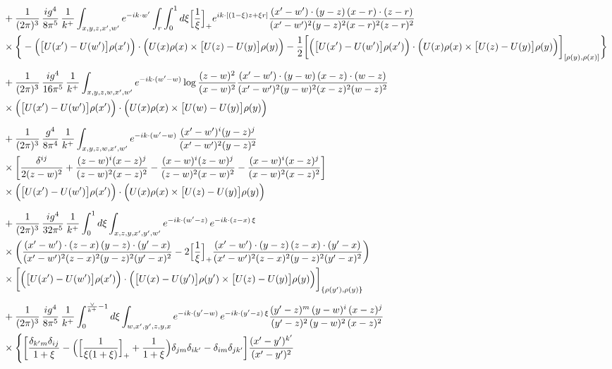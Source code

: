 \documentclass[10pt]{article}
\begin{document}
\begin{align}
&+\frac{1}{(2\pi)^{3}}\,\frac{ig^{4}}{8\pi^{5}}\,\frac{1}{k^{+}}\int_{x,y,z,x',w'}e^{-ik\cdot w'}\int_{r}\int_{0}^{1}d\xi\Big[\frac1\xi\Big]_{+}e^{ik\cdot[(1-\xi)z+\xi r]}\frac{(x'-w')\cdot(y-z)\,(x-r)\cdot(z-r)}{(x'-w')^{2}(y-z)^{2}(x-r)^{2}(z-r)^{2}}\notag\\
&\times\bigg\{-\Big(\big[U(x')-U(w')\big]\rho(x')\Big)\cdot\Big(U(x)\rho(x)\times\big[U(z)-U(y)\big]\rho(y)\Big)-\frac12\bigg[\Big(\big[U(x')-U(w')\big]\rho(x')\Big)\cdot\Big(U(x)\rho(x)\times\big[U(z)-U(y)\big]\rho(y)\Big)\bigg]_{[\rho(y),\rho(x)]}\bigg\}\notag\\[6pt]
&+\frac{1}{(2\pi)^{3}}\,\frac{ig^{4}}{16\pi^{5}}\,\frac{1}{k^{+}}\int_{x,y,z,w,x',w'}e^{-ik\cdot(w'-w)}\log\frac{(z-w)^{2}}{(x-w)^{2}}\frac{(x'-w')\cdot(y-w)\,(x-z)\cdot(w-z)}{(x'-w')^{2}(y-w)^{2}(x-z)^{2}(w-z)^{2}}\notag\\
&\times\Big(\big[U(x')-U(w')\big]\rho(x')\Big)\cdot\Big(U(x)\rho(x)\times\big[U(w)-U(y)\big]\rho(y)\Big)\notag\\[6pt]
&+\frac{1}{(2\pi)^{3}}\,\frac{g^{4}}{8\pi^{4}}\,\frac{1}{k^{+}}\int_{x,y,z,w,x',w'}e^{-ik\cdot(w'-w)}\,\frac{(x'-w')^{i}(y-z)^{j}}{(x'-w')^{2}(y-z)^{2}}\notag\\
&\times\bigg[\frac{\delta^{ij}}{2(z-w)^{2}}+\frac{(z-w)^{i}(x-z)^{j}}{(z-w)^{2}(x-z)^{2}}-\frac{(x-w)^{i}(z-w)^{j}}{(z-w)^{2}(x-w)^{2}}-\frac{(x-w)^{i}(x-z)^{j}}{(x-w)^{2}(x-z)^{2}}\bigg]\notag\\
&\times\Big(\big[U(x')-U(w')\big]\rho(x')\Big)\cdot\Big(U(x)\rho(x)\times\big[U(z)-U(y)\big]\rho(y)\Big)\notag\\[6pt]
&+\frac{1}{(2\pi)^{3}}\,\frac{ig^{4}}{32\pi^{5}}\,\frac{1}{k^{+}}\int_{0}^{1}d\xi\int_{x,z,y,x',y',w'}e^{-ik\cdot(w'-z)}\,e^{-ik\cdot(z-x)\,\xi}\notag\\
&\times\bigg(\frac{(x'-w')\cdot(z-x)\,(y-z)\cdot(y'-x)}{(x'-w')^{2}(z-x)^{2}(y-z)^{2}(y'-x)^{2}}-2\Big[\frac{1}{\xi}\Big]_{+}\frac{(x'-w')\cdot(y-z)\,(z-x)\cdot(y'-x)}{(x'-w')^{2}(z-x)^{2}(y-z)^{2}(y'-x)^{2}}\bigg)\notag\\
&\times\bigg[\Big(\big[U(x')-U(w')\big]\rho(x')\Big)\cdot\Big(\big[U(x)-U(y')\big]\rho(y')\times\big[U(z)-U(y)\big]\rho(y)\Big)\bigg]_{\{\rho(y'),\rho(y)\}}\notag\\[6pt]
&+\frac{1}{(2\pi)^{3}}\,\frac{ig^{4}}{8\pi^{5}}\,\frac{1}{k^{+}}\int_{0}^{\frac{\vee}{k^{+}}-1}d\xi\int_{w,x',y',z,y,x}e^{-ik\cdot(y'-w)}\,e^{-ik\cdot(y'-z)\,\xi}\frac{(y'-z)^{m}\,(y-w)^{i}\,(x-z)^{j}}{(y'-z)^{2}\,(y-w)^{2}\,(x-z)^{2}}\notag\\
&\times\Bigg\{\bigg[\frac{\delta_{k'm}\delta_{ij}}{1+\xi}-\Big(\Big[\frac{1}{\xi(1+\xi)}\Big]_{+}+\frac{1}{1+\xi}\Big)\delta_{jm}\delta_{ik'}-\delta_{im}\delta_{jk'}\bigg]\frac{(x'-y')^{k'}}{(x'-y')^{2}}\notag\\

\end{align}
\end{document}
